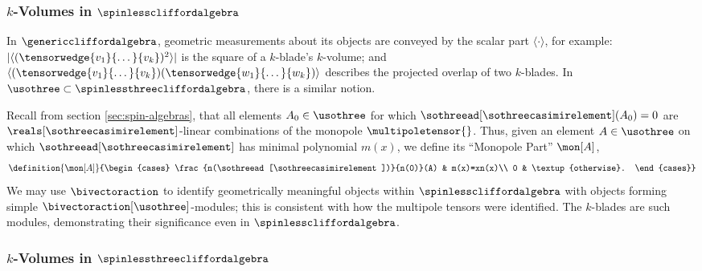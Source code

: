 \documentclass{article}
\begin{document}
\subsubsection{\texorpdfstring{$k$}{k}-Volumes in \texorpdfstring{$\spinlesscliffordalgebra$}{Cl-s-w(V,g)}}

In $\genericcliffordalgebra$, geometric measurements about its objects are conveyed by the scalar part\cite{doran-lasenby} $\langle\cdot\rangle$, for example: $|\langle(\tensorwedge{v_{1}}{\dots}{v_{k}})^{2}\rangle|$ is the square of a $k$-blade's $k$-volume; and $\langle(\tensorwedge{v_{1}}{\dots}{v_{k}})(\tensorwedge{w_{1}}{\dots}{w_{k}})\rangle$ describes the projected overlap of two $k$-blades. In $\usothree\subset\spinlessthreecliffordalgebra$, there is a similar notion.

Recall from section \ref{sec:spin-algebras}, that all elements $A_{0}\in\usothree$ for which $\sothreead[\sothreecasimirelement](A_{0})=0$ are $\reals[\sothreecasimirelement]$-linear combinations of the monopole $\multipoletensor{}$. Thus, given an element $A\in\usothree$ on which $\sothreead[\sothreecasimirelement]$ has minimal polynomial $m(x)$, we define its \enquote{Monopole Part} $\mon[A]$,
\begin{equation}
    \definition{\mon[A]}{\begin{cases}
        \frac{n(\sothreead[\sothreecasimirelement])}{n(0)}(A) & m(x)=xn(x)\\
        0 & \textup{otherwise}.
    \end{cases}}
\end{equation}
\noindent We may use $\bivectoraction$ to identify geometrically meaningful objects within $\spinlesscliffordalgebra$ with objects forming simple $\bivectoraction[\usothree]$-modules; this is consistent with how the multipole tensors were identified\cite{bradshaw}. The $k$-blades are such modules, demonstrating their significance even in $\spinlesscliffordalgebra$.

\subsubsection{\texorpdfstring{$k$}{k}-Volumes in \texorpdfstring{$\spinlessthreecliffordalgebra$}{Cl-s-w(E,delta)}}
\end{document}
